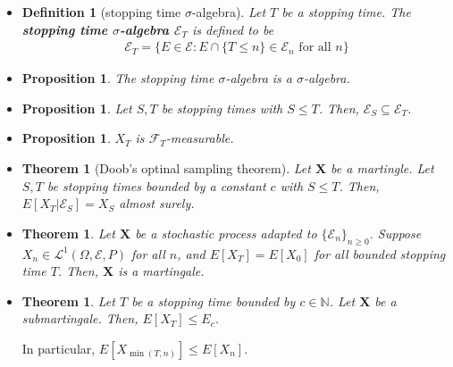\documentclass[10pt]{article}
\newtheorem{theorem}[lemma]{Theorem}
\newtheorem{definition}[lemma]{Definition}
\newtheorem{proposition}[lemma]{Proposition}
\numberwithin{lemma}{section}
\newcommand{\ve}[1]{\mathbf{#1}}
\newcommand{\mcal}[1]{\mathcal{#1}}
\newcommand{\Nat}{\mathbb{N}}
\begin{document}
\begin{itemize}
  \item \begin{definition}[stopping time $\sigma$-algebra]
    Let $T$ be a stopping time. The {\bf stopping time $\sigma$-algebra $\mcal{E}_T$} is defined to be
    \begin{align*}
      \mcal{E}_T = \{ E \in \mcal{E} : E \cap \{ T \leq n \} \in \mcal{E}_n \mbox{ for all } n \}
    \end{align*}
  \end{definition}

  \item \begin{proposition}
    The stopping time $\sigma$-algebra is a $\sigma$-algebra.
  \end{proposition}

  \item \begin{proposition}
    Let $S,T$ be stopping times with $S \leq T$. Then, $\mcal{E}_S \subseteq \mcal{E}_T$.
  \end{proposition}

  \item \begin{proposition}
    $X_T$ is $\mcal{F}_T$-measurable.
  \end{proposition}

  \item \begin{theorem}[Doob's optinal sampling theorem]
    Let $\ve{X}$ be a martingle. Let $S,T$ be stopping times bounded by a constant $c$ with $S \leq T$. Then, $E[X_T|\mcal{E}_S] = X_S$ almost surely.
  \end{theorem}

  \item \begin{theorem}
    Let $\ve{X}$ be a stochastic process adapted to $\{ \mcal{E}_n \}_{n \geq 0}$. Suppose $X_n \in \mcal{L}^1(\Omega, \mcal{E}, P)$ for all $n$, and $E[X_T] = E[X_0]$ for all bounded stopping time $T$. Then, $\ve{X}$ is a martingale.
  \end{theorem}

  \item \begin{theorem}
    Let $T$ be a stopping time bounded by $c \in \Nat$. Let $\ve{X}$ be a submartingale. Then, $E[X_T] \leq E_c$.
  \end{theorem}
  In particular, $E[X_{\min(T,n)}] \leq E[X_n]$.
\end{itemize}
\end{document}
